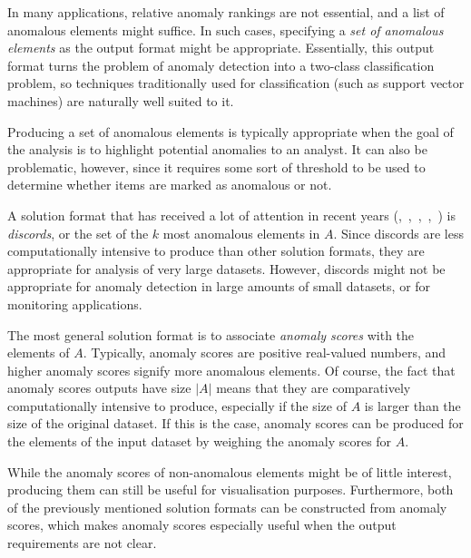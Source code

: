 In many applications, relative anomaly rankings are not essential, and a list of anomalous elements might suffice. In such cases, specifying a \emph{set of anomalous elements} as the output format might be appropriate. Essentially, this output format turns the problem of anomaly detection into a two-class classification problem, so techniques traditionally used for classification (such as support vector machines) are naturally well suited to it.

Producing a set of anomalous elements is typically appropriate when the goal of the analysis is to highlight potential anomalies to an analyst. It can also be problematic, however, since it requires some sort of threshold to be used to determine whether items are marked as anomalous or not.

A solution format that has received a lot of attention in recent years (\cite{keogh1},~\cite{bu},~\cite{yankov},~\cite{fu},~\cite{lin}) is \emph{discords}, or the set of the $k$ most anomalous elements in $A$. Since discords are less computationally intensive to produce than other solution formats, they are appropriate for analysis of very large datasets. However, discords might not be appropriate for anomaly detection in large amounts of small datasets, or for monitoring applications.

The most general solution format is to associate \emph{anomaly scores} with the elements of $A$. Typically, anomaly scores are positive real-valued numbers, and higher anomaly scores signify more anomalous elements. Of course, the fact that anomaly scores outputs have size $|A|$ means that they are comparatively computationally intensive to produce, especially if the size of $A$ is larger than the size of the original dataset. If this is the case, anomaly scores can be produced for the elements of the input dataset by weighing the anomaly scores for $A$.

While the anomaly scores of non-anomalous elements might be of little interest, producing them can still be useful for visualisation purposes. Furthermore, both of the previously mentioned solution formats can be constructed from anomaly scores, which makes anomaly scores especially useful when the output requirements are not clear.
